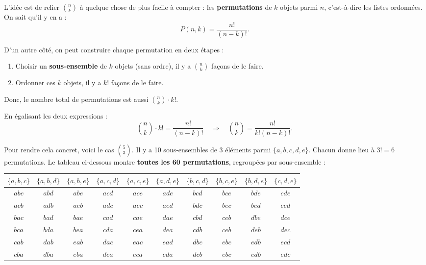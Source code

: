 \begin{intuitionbox}

L’idée est de relier $\binom{n}{k}$ à quelque chose de plus facile à compter : les \textbf{permutations} de $k$ objets parmi $n$, c’est-à-dire les listes ordonnées.  
On sait qu’il y en a :
\[
P(n,k) = \frac{n!}{(n-k)!}.
\]

D’un autre côté, on peut construire chaque permutation en deux étapes :
\begin{enumerate}
    \item Choisir un \textbf{sous-ensemble} de $k$ objets (sans ordre), il y a $\binom{n}{k}$ façons de le faire.
    \item Ordonner ces $k$ objets, il y a $k!$ façons de le faire.
\end{enumerate}
Donc, le nombre total de permutations est aussi $\binom{n}{k} \cdot k!$.

\medskip

\noindent En égalisant les deux expressions :
\[
\binom{n}{k} \cdot k! = \frac{n!}{(n-k)!}
\quad\Longrightarrow\quad
\binom{n}{k} = \frac{n!}{k!(n-k)!}.
\]

\medskip

\noindent Pour rendre cela concret, voici le cas $\binom{5}{3}$.  
Il y a 10 sous-ensembles de 3 éléments parmi $\{a,b,c,d,e\}$. Chacun donne lieu à $3! = 6$ permutations.  
Le tableau ci-dessous montre \textbf{toutes les 60 permutations}, regroupées par sous-ensemble :

\begin{center}
\small
\renewcommand{\arraystretch}{0.9}
\setlength{\tabcolsep}{2pt}
\begin{tabular}{|c|c|c|c|c|c|c|c|c|c|}
\hline
\textbf{$\{a,b,c\}$} & \textbf{$\{a,b,d\}$} & \textbf{$\{a,b,e\}$} & \textbf{$\{a,c,d\}$} & \textbf{$\{a,c,e\}$} & \textbf{$\{a,d,e\}$} & \textbf{$\{b,c,d\}$} & \textbf{$\{b,c,e\}$} & \textbf{$\{b,d,e\}$} & \textbf{$\{c,d,e\}$} \\
\hline
$abc$ & $abd$ & $abe$ & $acd$ & $ace$ & $ade$ & $bcd$ & $bce$ & $bde$ & $cde$ \\
\hline
$acb$ & $adb$ & $aeb$ & $adc$ & $aec$ & $aed$ & $bdc$ & $bec$ & $bed$ & $ced$ \\
\hline
$bac$ & $bad$ & $bae$ & $cad$ & $cae$ & $dae$ & $cbd$ & $ceb$ & $dbe$ & $dce$ \\
\hline
$bca$ & $bda$ & $bea$ & $cda$ & $cea$ & $dea$ & $cdb$ & $ceb$ & $deb$ & $dec$ \\
\hline
$cab$ & $dab$ & $eab$ & $dac$ & $eac$ & $ead$ & $dbc$ & $ebc$ & $edb$ & $ecd$ \\
\hline
$cba$ & $dba$ & $eba$ & $dca$ & $eca$ & $eda$ & $dcb$ & $ebc$ & $edb$ & $edc$ \\
\hline
\end{tabular}
\end{center}


\end{intuitionbox}
